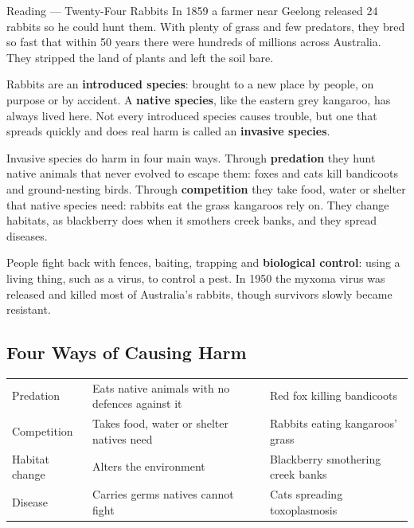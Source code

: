 \begin{readingbox}{Reading --- Twenty-Four Rabbits}
In 1859 a farmer near Geelong released 24 rabbits so he could hunt them. With plenty of grass and few predators, they bred so fast that within 50 years there were hundreds of millions across Australia. They stripped the land of plants and left the soil bare.

Rabbits are an \textbf{introduced species}: brought to a new place by people, on purpose or by accident. A \textbf{native species}, like the eastern grey kangaroo, has always lived here. Not every introduced species causes trouble, but one that spreads quickly and does real harm is called an \textbf{invasive species}.

Invasive species do harm in four main ways. Through \textbf{predation} they hunt native animals that never evolved to escape them: foxes and cats kill bandicoots and ground-nesting birds. Through \textbf{competition} they take food, water or shelter that native species need: rabbits eat the grass kangaroos rely on. They change habitats, as blackberry does when it smothers creek banks, and they spread diseases.

People fight back with fences, baiting, trapping and \textbf{biological control}: using a living thing, such as a virus, to control a pest. In 1950 the myxoma virus was released and killed most of Australia's rabbits, though survivors slowly became resistant.
\end{readingbox}

\rcreset
{}

\label{theory:9}

\subsection{Four Ways of Causing Harm}\label{sub:9.1}

\begin{ctab}
\begin{tabular}{|L{2.3cm}|L{3.8cm}|L{3.9cm}|}
  \hline{} &  &  \\ \hline
  Predation & Eats native animals with no defences against it & Red fox killing bandicoots \\ \hline
  Competition & Takes food, water or shelter natives need & Rabbits eating kangaroos' grass \\ \hline
  Habitat change & Alters the environment & Blackberry smothering creek banks \\ \hline
  Disease & Carries germs natives cannot fight & Cats spreading toxoplasmosis \\ \hline
\end{tabular}
\end{ctab}

